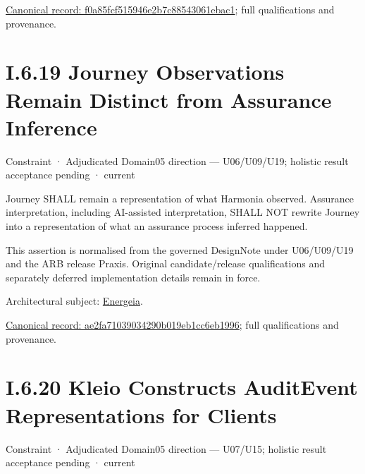 {\footnotesize \href{../../../../../../../../continuum/motivation/constraint/f0a85fcf515946e2b7c88543061ebac1.md}{Canonical record: f0a85fcf515946e2b7c88543061ebac1}; full qualifications and provenance.}\par
\section*{I.6.19 Journey Observations Remain Distinct from Assurance Inference}
\label{navigation:I.6.19}

\label{element:ae2fa71039034290b019eb1cc6eb1996}
{\small Constraint · Adjudicated Domain05 direction — U06/U09/U19; holistic result acceptance pending · current}\par

Journey SHALL remain a representation of what Harmonia observed. Assurance interpretation, including AI-assisted interpretation, SHALL NOT rewrite Journey into a representation of what an assurance process inferred happened.



This assertion is normalised from the governed DesignNote under U06/U09/U19 and the ARB release Praxis. Original candidate/release qualifications and separately deferred implementation details remain in force.



Architectural subject: \hyperref[element:fb3f37a6ac614415ac486a6de9d35994]{Energeia}.


{\footnotesize \href{../../../../../../../../continuum/motivation/constraint/ae2fa71039034290b019eb1cc6eb1996.md}{Canonical record: ae2fa71039034290b019eb1cc6eb1996}; full qualifications and provenance.}\par
\section*{I.6.20 Kleio Constructs AuditEvent Representations for Clients}
\label{navigation:I.6.20}

\label{element:1aa42a9aa5a644bc9072522e0a123352}
{\small Constraint · Adjudicated Domain05 direction — U07/U15; holistic result acceptance pending · current}\par

